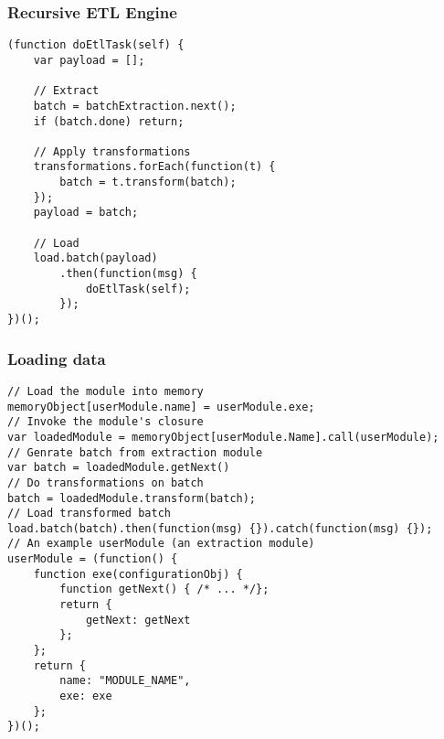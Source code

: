 \subsubsection{Recursive ETL Engine}
\label{appendix:netl-engine}
\begin{verbatim}
(function doEtlTask(self) {
    var payload = [];

    // Extract
    batch = batchExtraction.next();
    if (batch.done) return;

    // Apply transformations
    transformations.forEach(function(t) {
        batch = t.transform(batch);
    });
    payload = batch;

    // Load
    load.batch(payload)
        .then(function(msg) {
            doEtlTask(self);
        });
})();
\end{verbatim}

\subsubsection{Loading data}
\label{appendix:netl-loading}
\begin{verbatim}
// Load the module into memory
memoryObject[userModule.name] = userModule.exe;
// Invoke the module's closure
var loadedModule = memoryObject[userModule.Name].call(userModule);
// Genrate batch from extraction module
var batch = loadedModule.getNext()
// Do transformations on batch
batch = loadedModule.transform(batch);
// Load transformed batch
load.batch(batch).then(function(msg) {}).catch(function(msg) {});
// An example userModule (an extraction module)
userModule = (function() {
    function exe(configurationObj) {
        function getNext() { /* ... */};
        return {
            getNext: getNext
        };
    };
    return {
        name: "MODULE_NAME",
        exe: exe
    };
})();
\end{verbatim}